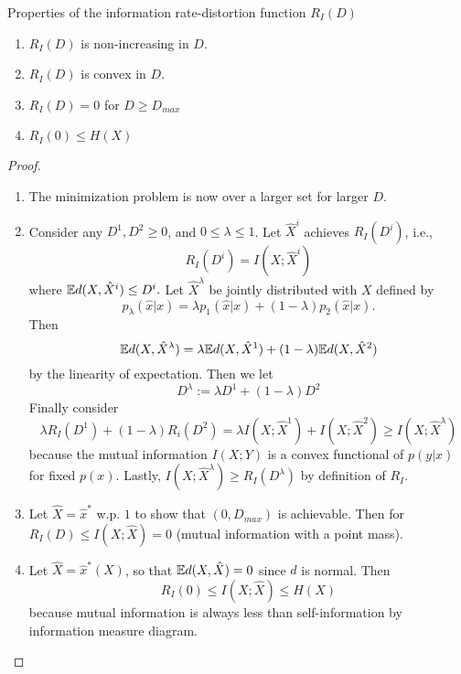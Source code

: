 \documentclass[../main.tex]{subfiles}
\begin{document}
\begin{bbox}{Properties of the information rate-distortion function $R_I(D)$}
    \begin{enumerate}
        \item $R_I(D)$ is non-increasing in $D$.
        \item $R_I(D)$ is convex in $D.$
        \item $R_I(D) = 0$ for $D\geq D_{max}$
        \item $R_I(0) \leq H(X)$
    \end{enumerate}
    \begin{proof}
        \begin{enumerate}
            \item The minimization problem is now over a larger set for larger $D$.
            \item Consider any $D^1, D^2\geq 0$, and $0\leq \lambda\leq 1$. Let $\hat X^i$ achieves $R_I(D^i)$, i.e., \[
                R_I(D^i)=I(X;\hat X^i)
            \] where $\mathbb{E} d(X,\hat X^i) \leq D^i.$
            \newline
            Let $\hat X^\lambda$ be jointly distributed with $X$ defined by 
            \[
            p_\lambda(\hat x|x)=\lambda p_1(\hat x|x) + (1-\lambda)p_2(\hat x|x).
            \] 
            Then 
            \[
            \mathbb{E} d(X,\hat X^\lambda) = \lambda \mathbb{E} d(X,\hat X^1) + (1-\lambda) \mathbb{E} d(X,\hat X^2)
            \]
            by the linearity of expectation. Then we let \[
            D^\lambda := \lambda D^1 + (1-\lambda) D^2
            \]
            Finally consider \[
            \lambda R_I(D^1) + (1-\lambda) R_i(D^2) = \lambda I(X;\hat X^1) + I(X;\hat X^2) \geq I(X;\hat X^\lambda)
            \] because the mutual information $I(X;Y)$ is a convex functional of $p(y|x)$ for fixed $p(x).$
            \newline
            Lastly, $I(X;\hat X^\lambda)\geq R_I(D^\lambda)$ by definition of $R_I.$

            \item Let $\hat X=\hat x^*$ w.p. $1$ to show that $(0,D_{max})$ is achievable. Then for $R_I(D)\leq I(X;\hat X)=0$ (mutual information with a point mass).

            \item Let $\hat X=\hat x^*(X)$, so that $\mathbb{E} d(X,\hat X)=0$ since $d$ is normal. Then \[
            R_I(0) \leq I(X;\hat X)\leq H(X)
            \] because mutual information is always less than self-information by information measure diagram.
        \end{enumerate}
    \end{proof}
\end{bbox}
\end{document}
